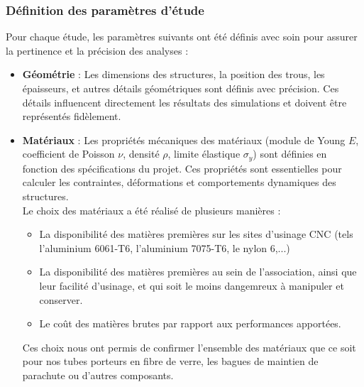 \subsubsection{Définition des paramètres d'étude}

Pour chaque étude, les paramètres suivants ont été définis avec soin pour assurer la 
pertinence et la précision des analyses :

\begin{itemize}
    \item \textbf{Géométrie} :
    Les dimensions des structures, la position des trous, les épaisseurs, et autres
     détails géométriques sont définis avec précision. Ces détails influencent 
     directement les résultats des simulations et doivent être représentés fidèlement.

    \item \textbf{Matériaux} :
    Les propriétés mécaniques des matériaux (module de Young \(E\), coefficient de 
    Poisson \(\nu\), densité \(\rho\), limite élastique \(\sigma_y\)) sont définies en 
    fonction des spécifications du projet. Ces propriétés sont essentielles pour 
    calculer les contraintes, déformations et comportements dynamiques des structures.\\

    Le choix des matériaux a été réalisé de plusieurs manières :
    \begin{itemize}
	\item La disponibilité des matières premières sur les sites d'usinage CNC (tels l'aluminium 6061-T6, l'aluminium 7075-T6, le nylon 6,...)
	\item La disponibilité des matières premières au sein de l'association, ainsi que leur facilité d'usinage, et qui soit le moins dangemreux à manipuler et conserver.
	\item Le coût des matières brutes par rapport aux performances apportées.
    \end{itemize}
	

	Ces choix nous ont permis de confirmer l'ensemble des matériaux que ce soit pour nos tubes porteurs en fibre de verre, les
    bagues de maintien de parachute ou d'autres composants.



\end{itemize}
